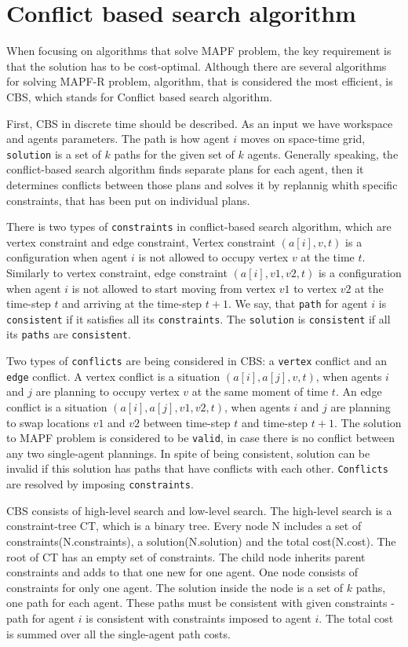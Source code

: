 \documentclass[thesis=B,english]{FITthesis}[2019/12/23]
\begin{document}
\section{Conflict based search algorithm}

When focusing on algorithms that solve MAPF problem, the key requirement is that the solution has to be cost-optimal. Although there are several algorithms for solving MAPF-R problem, algorithm, that is considered the most efficient, is CBS, which stands for  Conflict based search algorithm.

First, CBS in discrete time should be described. As an input we have workspace and agents parameters. The path is how agent $i$ moves on space-time grid, \verb|solution| is a set of $k$ paths for the given set of $k$ agents. Generally speaking, the conflict-based search algorithm finds separate plans for each agent, then it determines conflicts between those plans and solves it by replannig whith specific constraints, that has been put on individual plans.

There is two types of \verb|constraints| in conflict-based search algorithm, which are vertex constraint and edge constraint, Vertex constraint $(a[i], v, t)$ is a configuration when agent $i$ is not allowed to occupy vertex $v$ at the time $t$. Similarly to vertex constraint, edge constraint $(a[i], v1, v2, t)$ is a configuration when agent $i$ is not allowed to start moving from vertex $v1$ to vertex $v2$ at the time-step $t$ and arriving at the time-step $t+1$. We say, that \verb|path| for agent $i$ is \verb|consistent| if it satisfies all its \verb|constraints|. The \verb|solution| is \verb|consistent| if all its \verb|paths| are \verb|consistent|. 

Two types of \verb|conflicts| are being considered in CBS: a \verb|vertex| conflict and an \verb|edge| conflict. A vertex conflict is a situation $(a[i], a[j], v, t)$, when agents $i$ and $j$ are planning to occupy vertex $v$ at the same moment of time $t$. An edge conflict is a situation $(a[i], a[j], v1, v2, t)$, when agents $i$ and $j$ are planning to swap locations $v1$ and $v2$ between time-step $t$ and time-step $t+1$. The solution to MAPF problem is considered to be \verb|valid|, in case there is no conflict between any two single-agent plannings. In spite of being consistent, solution can be invalid if this solution has paths that have conflicts with each other. \verb|Conflicts| are resolved by imposing \verb|constraints|.

CBS consists of high-level search and low-level search. The high-level search is a constraint-tree CT, which is a binary tree. Every node N includes a set of constraints(N.constraints), a solution(N.solution) and the total cost(N.cost). The root of CT has an empty set of constraints. The child node inherits parent constraints and adds to that one new for one agent. One node consists of constraints for only one agent. The solution inside the node is a set of $k$ paths, one path for each agent. These paths must be consistent with given constraints - path for agent $i$ is consistent with constraints imposed to agent $i$. The total cost is summed over all the single-agent path costs.   
\end{document}
